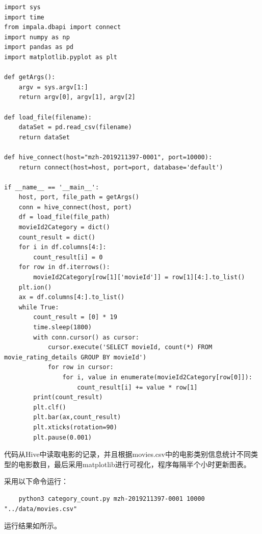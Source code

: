 \documentclass[lang=cn,11pt,a4paper,cite=authornum]{paper}
\begin{document}
\begin{code}
\begin{verbatim}
import sys
import time
from impala.dbapi import connect
import numpy as np
import pandas as pd
import matplotlib.pyplot as plt

def getArgs():
    argv = sys.argv[1:]
    return argv[0], argv[1], argv[2]

def load_file(filename):
    dataSet = pd.read_csv(filename)
    return dataSet

def hive_connect(host="mzh-2019211397-0001", port=10000):
    return connect(host=host, port=port, database='default')

if __name__ == '__main__':
    host, port, file_path = getArgs()
    conn = hive_connect(host, port)
    df = load_file(file_path)
    movieId2Category = dict()
    count_result = dict()
    for i in df.columns[4:]:
        count_result[i] = 0
    for row in df.iterrows():
        movieId2Category[row[1]['movieId']] = row[1][4:].to_list()
    plt.ion()
    ax = df.columns[4:].to_list()
    while True:
        count_result = [0] * 19
        time.sleep(1800)
        with conn.cursor() as cursor:
            cursor.execute('SELECT movieId, count(*) FROM movie_rating_details GROUP BY movieId')
            for row in cursor:
                for i, value in enumerate(movieId2Category[row[0]]):
                    count_result[i] += value * row[1]
        print(count_result)
        plt.clf()
        plt.bar(ax,count_result) 
        plt.xticks(rotation=90)
        plt.pause(0.001)
\end{verbatim}
\end{code}

代码从Hive中读取电影的记录，并且根据movies.csv中的电影类别信息统计不同类型的电影数目，最后采用matplotlib进行可视化，程序每隔半个小时更新图表。

采用以下命令运行：

\begin{code}
\begin{verbatim}
    python3 category_count.py mzh-2019211397-0001 10000 "../data/movies.csv"
\end{verbatim}
\end{code}

运行结果如所示。
\end{document}
